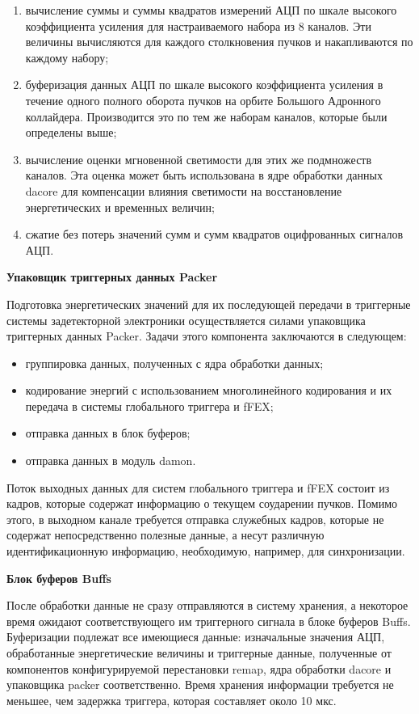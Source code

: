 \begin{enumerate}
    \item вычисление суммы и суммы квадратов измерений АЦП по шкале высокого коэффициента усиления для настраиваемого набора из 8 каналов. Эти величины вычисляются для каждого столкновения пучков и накапливаются по каждому набору;
    \item буферизация данных АЦП по шкале высокого коэффициента усиления в течение одного полного оборота пучков на орбите Большого Адронного коллайдера. Производится это по тем же наборам каналов, которые были определены выше;
    \item вычисление оценки мгновенной светимости для этих же подмножеств каналов. Эта оценка может быть использована в ядре обработки данных dacore для компенсации влияния светимости на восстановление энергетических и временных величин;
    \item сжатие без потерь значений сумм и сумм квадратов оцифрованных сигналов АЦП.
\end{enumerate}\par
\textbf{Упаковщик триггерных данных Packer}\par
Подготовка энергетических значений для их последующей передачи в триггерные системы задетекторной электроники осуществляется силами упаковщика триггерных данных Packer. Задачи этого компонента заключаются в следующем:\par
\begin{itemize}
    \item группировка данных, полученных с ядра обработки данных;
    \item кодирование энергий с использованием многолинейного кодирования и их передача в системы глобального триггера и fFEX;
    \item отправка данных в блок буферов;
    \item отправка данных в модуль damon.
\end{itemize}\par
Поток выходных данных для систем глобального триггера и fFEX состоит из кадров, которые содержат информацию о текущем соударении пучков. Помимо этого, в выходном канале требуется отправка служебных кадров, которые не содержат непосредственно полезные данные, а несут различную идентификационную информацию, необходимую, например, для синхронизации.\par
\textbf{Блок буферов Buffs}\par
После обработки данные не сразу отправляются в систему хранения, а некоторое время ожидают соответствующего им триггерного сигнала в блоке буферов Buffs. Буферизации подлежат все имеющиеся данные: изначальные значения АЦП, обработанные энергетические величины и триггерные данные, полученные от компонентов конфигурируемой перестановки remap, ядра обработки dacore и упаковщика packer соответственно. Время хранения информации требуется не меньшее, чем задержка триггера, которая составляет около 10 мкс.\par
